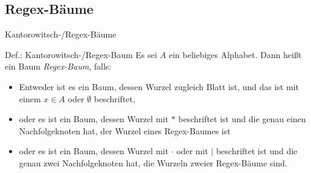 \subsection{Regex-Bäume}
\begin{frame}{Kantorowitsch-/Regex-Bäume}
    \begin{block}{Def.: Kantorowitsch-/Regex-Baum}
    	Es sei $A$ ein beliebiges Alphabet. Dann heißt ein Baum \emph{Regex-Baum}, falls:
    	\begin{itemize}
    		\item Entweder ist es ein Baum, dessen Wurzel zugleich Blatt ist, und das ist mit einem $x\in A$ oder $\emptyset$ beschriftet,
    		\item oder es ist ein Baum, dessen Wurzel mit $*$ beschriftet ist und die genau einen Nachfolgeknoten hat, der Wurzel eines Regex-Baumes ist
    		\item oder es ist ein Baum, dessen Wurzel mit $\cdot$ oder mit $|$ beschriftet ist und die genau zwei Nachfolgeknoten hat, die Wurzeln zweier Regex-Bäume sind. 
    	\end{itemize}
    \end{block}


      



    
\end{frame}

